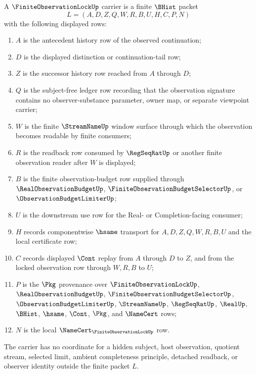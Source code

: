 \begin{definition}
\label{def:finite-observation-lock-carrier}
A $\FiniteObservationLockUp$ carrier is a finite $\BHist$ packet
$$
L=(A,D,Z,Q,W,R,B,U,H,C,P,N)
$$
with the following displayed rows:
\begin{enumerate}
\item $A$ is the antecedent history row of the observed continuation;
\item $D$ is the displayed distinction or continuation-tail row;
\item $Z$ is the successor history row reached from $A$ through $D$;
\item $Q$ is the subject-free ledger row recording that the observation signature contains no observer-substance parameter, owner map, or separate viewpoint carrier;
\item $W$ is the finite $\StreamNameUp$ window surface through which the observation becomes readable by finite consumers;
\item $R$ is the readback row consumed by $\RegSeqRatUp$ or another finite observation reader after $W$ is displayed;
\item $B$ is the finite observation-budget row supplied through $\RealObservationBudgetUp$, $\FiniteObservationBudgetSelectorUp$, or $\ObservationBudgetLimiterUp$;
\item $U$ is the downstream use row for the Real- or Completion-facing consumer;
\item $H$ records componentwise $\hsame$ transport for $A,D,Z,Q,W,R,B,U$ and the local certificate row;
\item $C$ records displayed $\Cont$ replay from $A$ through $D$ to $Z$, and from the locked observation row through $W,R,B$ to $U$;
\item $P$ is the $\Pkg$ provenance over $\FiniteObservationLockUp$, $\RealObservationBudgetUp$, $\FiniteObservationBudgetSelectorUp$, $\ObservationBudgetLimiterUp$, $\StreamNameUp$, $\RegSeqRatUp$, $\RealUp$, $\BHist$, $\hsame$, $\Cont$, $\Pkg$, and $\NameCert$ rows;
\item $N$ is the local $\NameCert_{\FiniteObservationLockUp}$ row.
\end{enumerate}
The carrier has no coordinate for a hidden subject, host observation, quotient stream, selected limit, ambient completeness principle, detached readback, or observer identity outside the finite packet $L$.
\end{definition}

